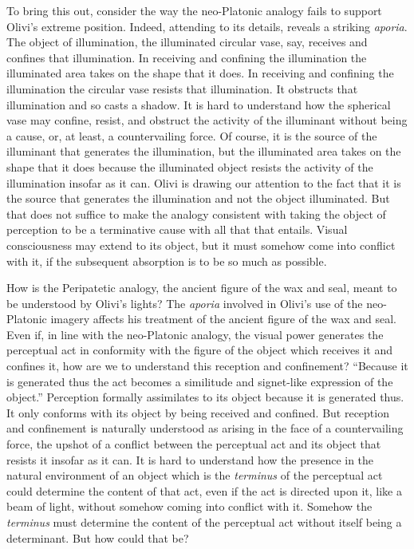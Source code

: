 \documentclass[12pt]{article}
\begin{document}
To bring this out, consider the way the neo-Platonic analogy fails to support Olivi's extreme position. Indeed, attending to its details, reveals a striking \emph{aporia}. The object of illumination, the illuminated circular vase, say, receives and confines that illumination. In receiving and confining the illumination the illuminated area takes on the shape that it does. In receiving and confining the illumination the circular vase resists that illumination. It obstructs that illumination and so casts a shadow. It is hard to understand how the spherical vase may confine, resist, and obstruct the activity of the illuminant without being a cause, or, at least, a countervailing force. Of course, it is the source of the illuminant that generates the illumination, but the illuminated area takes on the shape that it does because the illuminated object resists the activity of the illumination insofar as it can. Olivi is drawing our attention to the fact that it is the source that generates the illumination and not the object illuminated. But that does not suffice to make the analogy consistent with taking the object of perception to be a terminative cause with all that that entails. Visual consciousness may extend to its object, but it must somehow come into conflict with it, if the subsequent absorption is to be so much as possible. 

How is the Peripatetic analogy, the ancient figure of the wax and seal, meant to be understood by Olivi's lights? The \emph{aporia} involved in Olivi's use of the neo-Platonic imagery affects his treatment of the ancient figure of the wax and seal. Even if, in line with the neo-Platonic analogy, the visual power generates the perceptual act in conformity with the figure of the object which receives it and confines it, how are we to understand this reception and confinement? ``Because it is generated thus the act becomes a similitude and signet-like expression of the object.'' Perception formally assimilates to its object because it is generated thus. It only conforms with its object by being received and confined. But reception and confinement is naturally understood as arising in the face of a countervailing force, the upshot of a conflict between the perceptual act and its object that resists it insofar as it can. It is hard to understand how the presence in the natural environment of an object which is the \emph{terminus} of the perceptual act could determine the content of that act, even if the act is directed upon it, like a beam of light, without somehow coming into conflict with it. Somehow the \emph{terminus} must determine the content of the perceptual act without itself being a determinant. But how could that be?
\end{document}
